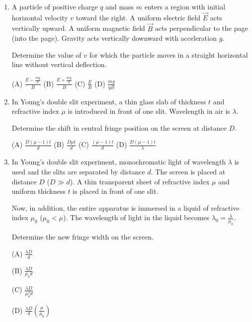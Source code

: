 \documentclass[12pt]{article}
\begin{document}
\begin{enumerate}[label=\arabic*., leftmargin=0pt, itemindent=18pt, itemsep=1em]
\item A particle of positive charge $q$ and mass $m$ enters a region with initial horizontal velocity $v$ toward the right. A uniform electric field $\vec{E}$ acts vertically upward. A uniform magnetic field $\vec{B}$ acts perpendicular to the page (into the page). Gravity acts vertically downward with acceleration $g$.

Determine the value of $v$ for which the particle moves in a straight horizontal line without vertical deflection.

\begin{center}
\end{center}

(A) $\frac{E - \frac{mg}{q}}{B}$  
(B) $\frac{E + \frac{mg}{q}}{B}$  
(C) $\frac{E}{B}$  
(D) $\frac{mg}{qB}$

\item In Young’s double slit experiment, a thin glass slab of thickness $t$ and refractive index $\mu$ is introduced in front of one slit. Wavelength in air is $\lambda$.

Determine the shift in central fringe position on the screen at distance $D$.

(A) $\frac{D(\mu -1)t}{d}$  
(B) $\frac{D\mu t}{d}$  
(C) $\frac{(\mu -1)t}{d}$  
(D) $\frac{D(\mu -1)t}{\lambda}$

\item In Young’s double slit experiment, monochromatic light of wavelength $\lambda$ is used and the slits are separated by distance $d$. The screen is placed at distance $D$ ($D \gg d$). A thin transparent sheet of refractive index $\mu$ and uniform thickness $t$ is placed in front of one slit.

Now, in addition, the entire apparatus is immersed in a liquid of refractive index $\mu_0$ ($\mu_0 < \mu$). The wavelength of light in the liquid becomes $\lambda_0 = \frac{\lambda}{\mu_0}$.

Determine the new fringe width on the screen.

(A) $\displaystyle \frac{\lambda D}{d}$  

(B) $\displaystyle \frac{\lambda D}{\mu_0 d}$  

(C) $\displaystyle \frac{\lambda D}{\mu_0^2 d}$  

(D) $\displaystyle \frac{\lambda D}{d} \left( \frac{\mu}{\mu_0} \right)$

\end{enumerate}
\end{document}
